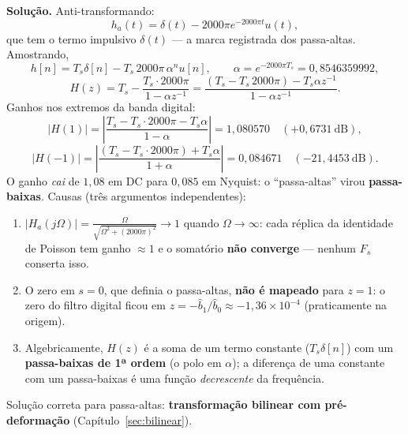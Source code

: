 \textbf{Solução.} Anti-transformando:
\[
  h_a(t)=\delta(t)-2000\pi e^{-2000\pi t}u(t),
\]
que tem o termo impulsivo $\delta(t)$ — a marca registrada dos passa-altas.
Amostrando,
\[
  h[n]=T_s\delta[n]-T_s\,2000\pi\,\alpha^{n}u[n],\qquad
  \alpha=e^{-2000\pi T_s}=0{,}8546359992,
\]
\[
  H(z)=T_s-\frac{T_s\cdot2000\pi}{1-\alpha z^{-1}}
      =\frac{(T_s-T_s\,2000\pi)-T_s\alpha z^{-1}}{1-\alpha z^{-1}} .
\]
Ganhos nos extremos da banda digital:
\[
  |H(1)|=\left|\frac{T_s-T_s\cdot2000\pi-T_s\alpha}{1-\alpha}\right|
  =1{,}080570 \quad(+0{,}6731\ \text{dB}),
\]
\[
  |H(-1)|=\left|\frac{(T_s-T_s\cdot2000\pi)+T_s\alpha}{1+\alpha}\right|
  =0{,}084671 \quad(-21{,}4453\ \text{dB}) .
\]
O ganho \emph{cai} de $1{,}08$ em DC para $0{,}085$ em Nyquist: o
``passa-altas'' virou \textbf{passa-baixas}. Causas (três argumentos
independentes):
\begin{enumerate}
  \item $|H_a(j\Omega)|=\frac{\Omega}{\sqrt{\Omega^2+(2000\pi)^2}}\to1$
        quando $\Omega\to\infty$: cada réplica da identidade de Poisson tem
        ganho $\approx1$ e o somatório \textbf{não converge} — nenhum $F_s$
        conserta isso.
  \item O zero em $s=0$, que definia o passa-altas, \textbf{não é mapeado}
        para $z=1$: o zero do filtro digital ficou em
        $z=-\hat{b}_1/\hat{b}_0\approx-1{,}36\times10^{-4}$ (praticamente na
        origem).
  \item Algebricamente, $H(z)$ é a soma de um termo constante
        ($T_s\delta[n]$) com um \textbf{passa-baixas de 1ª ordem} (o polo em
        $\alpha$); a diferença de uma constante com um passa-baixas é uma
        função \emph{decrescente} da frequência.
\end{enumerate}
Solução correta para passa-altas: \textbf{transformação bilinear com
pré-deformação} (Capítulo~\ref{sec:bilinear}).

